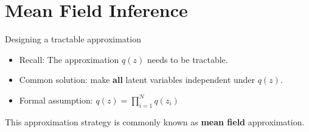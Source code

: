 \documentclass[14pt, aspectratio=169]{beamer}
\begin{document}
%
%

\section{Mean Field Inference}
\frame{\tableofcontents[currentsection]}

\begin{frame}{Designing a tractable approximation}
\begin{itemize}
\item Recall: The approximation $ q(z) $ needs to be tractable.
\item Common solution: make \textbf{all} latent variables independent under $ q(z) $.
\pause
\item Formal assumption: $ q(z) = \prod_{i=1}^{N}q(z_{i}) $
\end{itemize}
\pause
This approximation strategy is commonly known as \textbf{mean field} approximation.
\end{frame}
\end{document}
